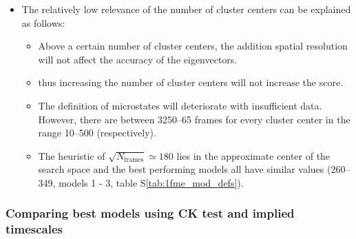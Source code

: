 \documentclass[journal=jacsat,manuscript=article]{achemso}
\newcommand*\sref[1]{%
    S\ref{#1}}
\begin{document}
\begin{itemize}
\begin{itemize}
    \end{itemize}
    \item The relatively low relevance of the number of cluster centers can be explained as follows: 
    \begin{itemize}
        \item Above a certain number of cluster centers, the addition spatial resolution will not affect the accuracy of the eigenvectors.  
        \item thus increasing the number of cluster centers will not increase the score.  
        \item The definition of microstates will deteriorate with insufficient data. However, there are between \numrange{3250}{65} frames for every cluster center in the range \numrange{10}{500} (respectively). 
        \item The heuristic of $\sqrt{N_{\mathrm{frames}}} \simeq 180$ lies in the approximate center of the search space and the best performing models all have similar values (\numrange{260}{349}, models 1 - 3, table \sref{tab:1fme_mod_defs}).  
    \end{itemize}
\end{itemize}


\subsubsection{Comparing best models using CK test and implied timescales}
\end{document}
